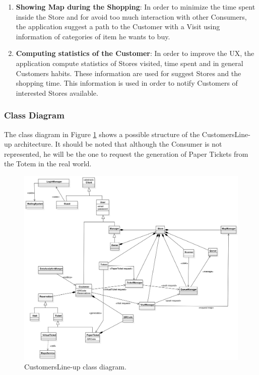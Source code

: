 \documentclass[a4paper, 12pt, oneside]{article}
\newcommand{\yasmin}[1]{\textcolor{Red}{#1}}
\newcommand{\giovanni}[1]{\textcolor{Blue}{#1}}
\begin{document}
\begin{enumerate}
\item \textbf{Showing Map during the Shopping}: In order to minimize the time spent inside the Store and for avoid too much interaction with other Consumers, the application suggest a path to the Customer with a Visit using information of categories of item he wants to buy.

\item \textbf{Computing statistics of the Customer}: In order to improve the UX, the application compute statistics of Stores visited, time spent and in general Customers habits. These information are used for suggest Stores and the shopping time. This information is used in order to notify Customers of interested Stores available. %
\end{enumerate}
\subsubsection{Class Diagram}
The class diagram in Figure \ref{class_diagram} shows a possible structure of the CustomersLine-up architecture. It should be noted that although the Consumer is not represented, he will be the one to request the generation of Paper Tickets from the Totem in the real world.
\begin{figure}[h!]
\centering
    \centering
    \includegraphics[height=0.55\textheight, scale=0.2, keepaspectratio]{img/class_diagram.jpg}
    \caption{CustomersLine-up class diagram.}
    \label{class_diagram}
\end{figure}
\end{document}
